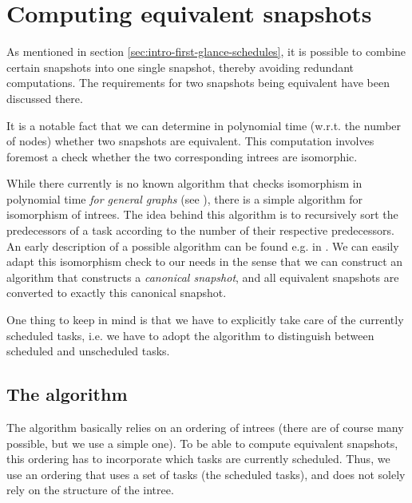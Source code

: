 \section{Computing equivalent snapshots}
\label{sec:algorithm-equivalent-snapshot}

As mentioned in section \ref{sec:intro-first-glance-schedules}, it is possible to combine certain snapshots into one single snapshot, thereby avoiding redundant computations. The requirements for two snapshots being equivalent have been discussed there.

It is a notable fact that we can determine in polynomial time (w.r.t. the number of nodes) whether two snapshots are equivalent. This computation involves foremost a check whether the two corresponding intrees are isomorphic. 


While there currently is no known algorithm that checks isomorphism in polynomial time \emph{for general graphs} (see \cite{arora2009computational}), there is a simple algorithm for isomorphism of intrees. The idea behind this algorithm is to recursively sort the predecessors of a task according to the number of their respective predecessors. An early description of a possible algorithm can be found e.g. in \cite{aho1974design}. We can easily adapt this isomorphism check to our needs in the sense that we can construct an algorithm that constructs a \emph{canonical snapshot}, and all equivalent snapshots are converted to exactly this canonical snapshot.

One thing to keep in mind is that we have to explicitly take care of the currently scheduled tasks, i.e. we have to adopt the algorithm to distinguish between scheduled and unscheduled tasks.

\subsection{The algorithm}
\label{sec:algorithm-equiv-snapshots-actual-algo}

The algorithm basically relies on an ordering of intrees (there are of course many possible, but we use a simple one). To be able to compute equivalent snapshots, this ordering has to incorporate which tasks are currently scheduled. Thus, we use an ordering that uses a set of tasks (the scheduled tasks), and does not solely rely on the structure of the intree.


